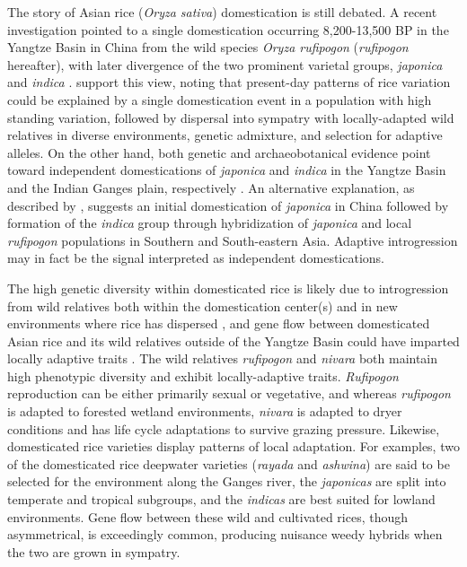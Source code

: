 \documentclass[11pt]{article}
\begin{document}
\begin{enumerate}
The story of Asian rice (\emph{Oryza sativa}) domestication is still debated.
A recent investigation pointed to a single domestication occurring 8,200-13,500 BP in the Yangtze Basin in China from the wild species \emph{Oryza rufipogon} (\emph{rufipogon} hereafter), with later divergence of the two prominent varietal groups, \emph{japonica} and \emph{indica} \cite{molina2011molecular}.
\cite{vaughan2008evolving} support this view, noting that present-day patterns of rice variation could be explained by a single domestication event in a population with high standing variation, followed by dispersal into sympatry with locally-adapted wild relatives in diverse environments, genetic admixture, and selection for adaptive alleles.
On the other hand, both genetic and archaeobotanical evidence point toward independent domestications of \emph{japonica} and \emph{indica} in the Yangtze Basin and the Indian Ganges plain, respectively \cite{fuller2010consilience}.
An alternative explanation, as described by \cite{Huang2012}, suggests an initial domestication of \emph{japonica} in China followed by formation of the \emph{indica} group through hybridization of \emph{japonica} and local \emph{rufipogon} populations in Southern and South-eastern Asia.
Adaptive introgression may in fact be the signal interpreted as independent domestications.



The high genetic diversity within domesticated rice is likely due to introgression from wild relatives both within the domestication center(s) and in new environments where rice has dispersed \cite{second1982origin}, and gene flow between domesticated Asian rice and its wild relatives outside of the Yangtze Basin could have imparted locally adaptive traits \cite{vaughan2008evolving}.
The wild relatives \emph{rufipogon} and \emph{nivara} both maintain high phenotypic diversity and exhibit locally-adaptive traits.
\emph{Rufipogon} reproduction can be either primarily sexual or vegetative, and whereas \emph{rufipogon} is adapted to forested wetland environments, \emph{nivara} is adapted to dryer conditions and has life cycle adaptations to survive grazing pressure.
Likewise, domesticated rice varieties display patterns of local adaptation.
For examples, two of the domesticated rice deepwater varieties (\emph{rayada} and \emph{ashwina}) are said to be selected for the environment along the Ganges river, the \emph{japonicas} are split into temperate and tropical subgroups, and the \emph{indicas} are best suited for lowland environments.
Gene flow between these wild and cultivated rices, though asymmetrical, is exceedingly common, producing nuisance weedy hybrids when the two are grown in sympatry.




\end{enumerate}
\end{document}
